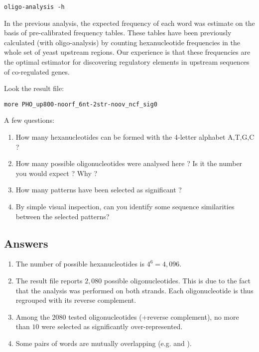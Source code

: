 {\color{Blue} \begin{footnotesize} 
\begin{verbatim} 
oligo-analysis -h
\end{verbatim} \end{footnotesize}
}


In the previous analysis, the expected frequency of each word was
estimate on the basis of pre-calibrated frequency tables.  These
tables have been previously calculated (with oligo-analysis) by
counting hexanucleotide frequencies in the whole set of yeast upstream
regions. Our experience is that these frequencies are the optimal
estimator for discovering regulatory elements in upstream sequences of
co-regulated genes.

Look the result file:

{\color{Blue} \begin{footnotesize} 
\begin{verbatim}
more PHO_up800-noorf_6nt-2str-noov_ncf_sig0
\end{verbatim} \end{footnotesize}
}


A few questions:
\begin{enumerate}
\item How many hexanucleotides can be formed with the 4-letter alphabet A,T,G,C ?
\item How many possible oligonucleotides were analysed here ? Is it the
  number you would expect ? Why ?
\item How many patterns have been selected as significant ?
\item By simple visual inspection, can you identify some sequence
  similarities between the selected patterns?
\end{enumerate}

\subsection{Answers}

\begin{enumerate}
\item The number of possible hexanucleotides is $4^6=4,096$. 
\item The result file reports $2,080$ possible oligonucleotides. This
  is due to the fact that the analysis was performed on both
  strands. Each oligonucleotide is thus regrouped with its reverse
  complement.
\item Among the 2080 tested oligonucleotides (+reverse complement), no
  more than $10$ were selected as significantly over-represented.
\item Some pairs of words are mutually overlapping
  (e.g.  and ).
\end{enumerate}

